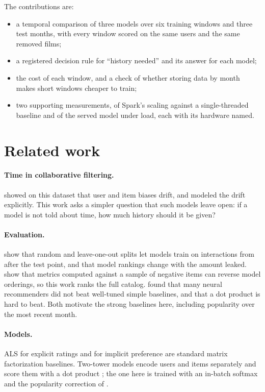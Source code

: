 \documentclass[11pt]{article}
\begin{document}
The contributions are:
\begin{itemize}
  \item a temporal comparison of three models over six training windows and three test months,
    with every window scored on the same users and the same removed films;
  \item a registered decision rule for ``history needed'' and its answer for each model;
  \item the cost of each window, and a check of whether storing data by month makes short
    windows cheaper to train;
  \item two supporting measurements, of Spark's scaling against a single-threaded baseline and
    of the served model under load, each with its hardware named.
\end{itemize}

\section{Related work}

\paragraph{Time in collaborative filtering.} \citet{koren2009temporal} showed on this dataset
that user and item biases drift, and modeled the drift explicitly. This work asks a simpler
question that such models leave open: if a model is not told about time, how much history should
it be given?

\paragraph{Evaluation.} \citet{ji2023leakage} show that random and leave-one-out splits let models
train on interactions from after the test point, and that model rankings change with the amount
leaked. \citet{krichene2020sampled} show that metrics computed against a sample of negative items
can reverse model orderings, so this work ranks the full catalog. \citet{dacrema2019progress}
found that many neural recommenders did not beat well-tuned simple baselines, and
\citet{rendle2020ncf} that a dot product is hard to beat. Both motivate the strong baselines
here, including popularity over the most recent month.

\paragraph{Models.} ALS for explicit ratings \citep{zhou2008als} and for implicit preference
\citep{hu2008implicit} are standard matrix factorization baselines. Two-tower models encode users
and items separately and score them with a dot product \citep{covington2016youtube}; the one here
is trained with an in-batch softmax and the popularity correction of \citet{yi2019sampling}.
\end{document}
